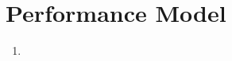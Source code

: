 \documentclass{article}
\begin{document}
\section*{Performance Model}

\begin{enumerate}[label=\alph*)]
\item
\end{enumerate}
\end{document}
